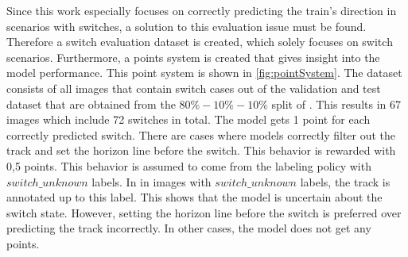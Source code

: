 Since this work especially focuses on correctly predicting the train's direction in scenarios with switches, a solution to this evaluation issue must be found.
Therefore a switch evaluation dataset is created, which solely focuses on switch scenarios.
Furthermore, a points system is created that gives insight into the model performance.
This point system is shown in \autoref{fig:pointSystem}.
The dataset consists of all images that contain switch cases out of the validation and test dataset that are obtained from the $80\%-10\%-10\%$ split of \cite{tepNet2024}.
This results in 67 images which include 72 switches in total.
The model gets 1 point for each correctly predicted switch.
There are cases where models correctly filter out the track and set the horizon line before the switch.
This behavior is rewarded with 0,5 points.
This behavior is assumed to come from the labeling policy with $switch\_unknown$ labels.
In \cite{tepNet2024} in images with $switch\_unknown$ labels, the track is annotated up to this label.
This shows that the model is uncertain about the switch state.
However, setting the horizon line before the switch is preferred over predicting the track incorrectly.
In other cases, the model does not get any points.

